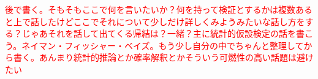 

\textcolor{red}{後で書く。そもそもここで何を言いたいか？何を持って検証とするかは複数あると上で話したけどここでそれについて少しだけ詳しくみようみたいな話し方をする？じゃあそれを話して出てくる帰結は？一緒？主に統計的仮設検定の話を書こう。ネイマン・フィッシャー・ベイズ。もう少し自分の中でちゃんと整理してから書く。あんまり統計的推論とか確率解釈とかそういう可燃性の高い話題は避けたい}




